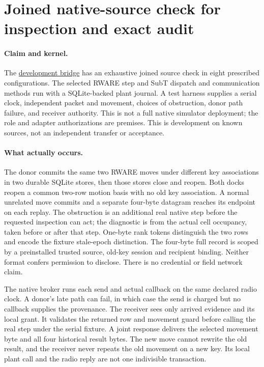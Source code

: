 \documentclass{article}
\begin{document}
\section*{Joined native-source check for inspection and exact audit}
\paragraph{Claim and kernel.}
The \href{https://github.com/eternal-november/eos-research-programmes/pull/826}{development bridge}
has an exhaustive joined source check in eight prescribed configurations.
The selected RWARE step and SubT dispatch and communication methods
run with a SQLite-backed plant journal. A test harness supplies a
serial clock, independent packet and movement, choices of obstruction,
donor path failure, and receiver authority. This is not a full
native simulator deployment; the role and adapter authorizations
are premises. This is development on known sources, not an
independent transfer or acceptance.

\paragraph{What actually occurs.}
The donor commits the same two RWARE moves under different key
associations in two durable SQLite stores, then those stores close
and reopen. Both docks reopen a common two-row motion basis with no
old key association. A normal unrelated move commits and a separate
four-byte datagram reaches its endpoint on each replay. The obstruction
is an additional real native step before the requested inspection
can act; the diagnostic is from the actual cell occupancy, taken
before or after that step. One-byte rank tokens distinguish the two
rows and encode the fixture stale-epoch distinction. The four-byte
full record is scoped by a preinstalled trusted source, old-key
session and recipient binding. Neither format confers permission
to disclose. There is no credential or field network claim.

The native broker runs each send and actual callback on the
same declared radio clock. A donor's late path can fail, in which
case the send is charged but no callback supplies the provenance.
The receiver sees only arrived evidence and its local grant.
It validates the returned row and movement guard before calling
the real step under the serial fixture. A joint response delivers
the selected movement byte and all four historical result bytes.
The new move cannot rewrite the old result, and the receiver never
repeats the old movement on a new key. Its local plant call and the
radio reply are not one indivisible transaction.
\end{document}
